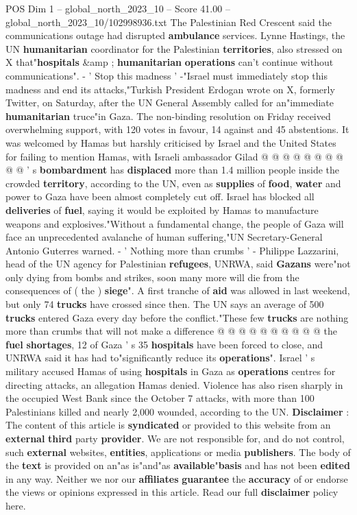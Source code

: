 \begin{textsample}{POS Dim 1 – global\_north\_2023\_10 – Score 41.00 – global\_north\_2023\_10/102998936.txt}
The Palestinian Red Crescent said the communications outage had disrupted \textbf{ambulance} services.
Lynne Hastings, the UN \textbf{humanitarian} coordinator for the Palestinian \textbf{territories}, also stressed on X that"\textbf{hospitals} \&amp ; \textbf{humanitarian} \textbf{operations} can't continue without communications". - ' Stop this madness ' -"Israel must immediately stop this madness and end its attacks,"Turkish President Erdogan wrote on X, formerly Twitter, on Saturday, after the UN General Assembly called for an"immediate \textbf{humanitarian} truce"in Gaza.
The non-binding resolution on Friday received overwhelming support, with 120 votes in favour, 14 against and 45 abstentions.
It was welcomed by Hamas but harshly criticised by Israel and the United States for failing to mention Hamas, with Israeli ambassador Gilad @ @ @ @ @ @ @ @ @ @ ' s \textbf{bombardment} has \textbf{displaced} more than 1.4 million people inside the crowded \textbf{territory}, according to the UN, even as \textbf{supplies} of \textbf{food}, \textbf{water} and power to Gaza have been almost completely cut off.
Israel has blocked all \textbf{deliveries} of \textbf{fuel}, saying it would be exploited by Hamas to manufacture weapons and explosives."Without a fundamental change, the people of Gaza will face an unprecedented avalanche of human suffering,"UN Secretary-General Antonio Guterres warned. - ' Nothing more than crumbs ' - Philippe Lazzarini, head of the UN agency for Palestinian \textbf{refugees}, UNRWA, said \textbf{Gazans} were"not only dying from bombs and strikes, soon many more will die from the consequences of ( the ) \textbf{siege}".
A first tranche of \textbf{aid} was allowed in last weekend, but only 74 \textbf{trucks} have crossed since then.
The UN says an average of 500 \textbf{trucks} entered Gaza every day before the conflict."These few \textbf{trucks} are nothing more than crumbs that will not make a difference @ @ @ @ @ @ @ @ @ @ the \textbf{fuel} \textbf{shortages}, 12 of Gaza ' s 35 \textbf{hospitals} have been forced to close, and UNRWA said it has had to"significantly reduce its \textbf{operations}".
Israel ' s military accused Hamas of using \textbf{hospitals} in Gaza as \textbf{operations} centres for directing attacks, an allegation Hamas denied.
Violence has also risen sharply in the occupied West Bank since the October 7 attacks, with more than 100 Palestinians killed and nearly 2,000 wounded, according to the UN. \textbf{Disclaimer} : The content of this article is \textbf{syndicated} or provided to this website from an \textbf{external} \textbf{third} party \textbf{provider}.
We are not responsible for, and do not control, such \textbf{external} websites, \textbf{entities}, applications or media \textbf{publishers}.
The body of the \textbf{text} is provided on an"as is"and"as \textbf{available}"\textbf{basis} and has not been \textbf{edited} in any way.
Neither we nor our \textbf{affiliates} \textbf{guarantee} the \textbf{accuracy} of or endorse the views or opinions expressed in this article.
Read our full \textbf{disclaimer} policy here.


\end{textsample}
